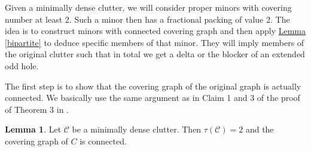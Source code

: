 \documentclass[a4paper, 12pt]{scrbook}
\theoremstyle{definition}
\newtheorem{lemma}[theorem]{Lemma}
\begin{document}
   Given a minimally dense clutter, we will consider proper minors with covering number at least 2.
   Such a minor then has a fractional packing of value 2.
   The idea is to construct minors with connected covering graph and then apply \hyperref[bipartite]{Lemma \ref*{bipartite}} to deduce specific members of that minor.
   They will imply members of the original clutter such that in total we get a delta or the blocker of an extended odd hole.

   The first step is to show that the covering graph of the original graph is actually connected.
   We basically use the same argument as in Claim 1 and 3 of the proof of Theorem 3 in \cite{deltas}.

   \begin{lemma}\label{connectivity}
       Let $\mathcal{C}$ be a minimally dense clutter.
       Then $\tau(\mathcal{C})=2$ and the covering graph of $C$ is connected.
   \end{lemma}
\end{document}

